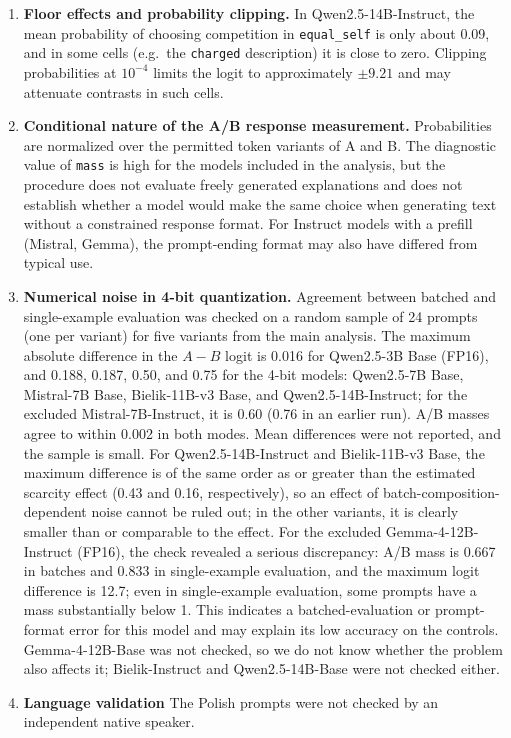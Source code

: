 \documentclass[11pt]{article}
\newcommand{\equalself}{\texttt{equal\_self}}
\begin{document}
\begin{enumerate}[leftmargin=1.6em,itemsep=0.25em]
    \item \textbf{Floor effects and probability clipping.}
    In Qwen2.5-14B-Instruct, the mean probability of choosing competition in \equalself{} is only about 0.09, and in some cells (e.g.\ the \texttt{charged} description) it is close to zero. Clipping probabilities at $10^{-4}$ limits the logit to approximately $\pm9.21$ and may attenuate contrasts in such cells.

    \item \textbf{Conditional nature of the A/B response measurement.}
    Probabilities are normalized over the permitted token variants of A and B. The diagnostic value of \texttt{mass} is high for the models included in the analysis, but the procedure does not evaluate freely generated explanations and does not establish whether a model would make the same choice when generating text without a constrained response format. For Instruct models with a prefill (Mistral, Gemma), the prompt-ending format may also have differed from typical use.

    \item \textbf{Numerical noise in 4-bit quantization.}
    Agreement between batched and single-example evaluation was checked on a random sample of 24 prompts (one per variant) for five variants from the main analysis. The maximum absolute difference in the $A-B$ logit is 0.016 for Qwen2.5-3B Base (FP16), and 0.188, 0.187, 0.50, and 0.75 for the 4-bit models: Qwen2.5-7B Base, Mistral-7B Base, Bielik-11B-v3 Base, and Qwen2.5-14B-Instruct; for the excluded Mistral-7B-Instruct, it is 0.60 (0.76 in an earlier run). A/B masses agree to within 0.002 in both modes. Mean differences were not reported, and the sample is small. For Qwen2.5-14B-Instruct and Bielik-11B-v3 Base, the maximum difference is of the same order as or greater than the estimated scarcity effect (0.43 and 0.16, respectively), so an effect of batch-composition-dependent noise cannot be ruled out; in the other variants, it is clearly smaller than or comparable to the effect. For the excluded Gemma-4-12B-Instruct (FP16), the check revealed a serious discrepancy: A/B mass is 0.667 in batches and 0.833 in single-example evaluation, and the maximum logit difference is 12.7; even in single-example evaluation, some prompts have a mass substantially below 1. This indicates a batched-evaluation or prompt-format error for this model and may explain its low accuracy on the controls. Gemma-4-12B-Base was not checked, so we do not know whether the problem also affects it; Bielik-Instruct and Qwen2.5-14B-Base were not checked either.

    \item \textbf{Language validation}
    The Polish prompts were not checked by an independent native speaker.

\end{enumerate}
\end{document}
